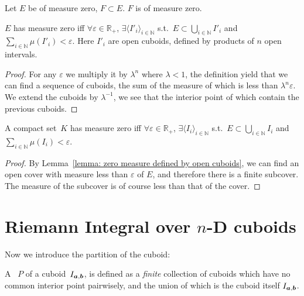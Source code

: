 \documentclass[openany]{book}
\begin{document}
\begin{theorem}
	\label{theorem: the subset of a set of measure zero is also of measure zero}
	Let $E$ be of measure zero, $F \subset E$. $F$ is of measure zero.
\end{theorem}

\begin{lemma}
	\label{lemma: zero measure defined by open cuboids}
	$E$ has measure zero iff $\forall \varepsilon \in \mathbb R_+$, $\exists \langle I'_i\rangle_{i \in \mathbb N}$ s.t.\ $E \subset \bigcup_{i \in \mathbb N} I'_i$ and $\sum_{i \in \mathbb N} \mu(I'_i) < \varepsilon$.
	Here $I'_i$ are open cuboids, defined by products of $n$ open intervals. 
\end{lemma}
\begin{proof}
	For any $\varepsilon$ we multiply it by $\lambda^n$ where $\lambda < 1$, the definition yield that we can find a sequence of cuboids, the sum of the measure of which is less than $\lambda^n \varepsilon$.
	We extend the cuboids by $\lambda^{-1}$, we see that the interior point of which contain the previous cuboids.
\end{proof}

\begin{theorem}
	\label{theorem: compact zero measure defined by finite cuboids}
	A compact set~$K$ has measure zero iff $\forall \varepsilon \in \mathbb R_+$, $\exists \langle I_i\rangle_{i \in \mathbb N}$ s.t.\ $E \subset \bigcup_{i \in \mathbb N} I_i$ and $\sum_{i \in \mathbb N} \mu(I_i) < \varepsilon$. 
\end{theorem}
\begin{proof}
	By Lemma~\ref{lemma: zero measure defined by open cuboids}, we can find an open cover with measure less than $\varepsilon$ of $E$, and therefore there is a finite subcover. 
	The measure of the subcover is of course less than that of the cover. 
\end{proof}

\section{\texorpdfstring{Riemann Integral over $n$-D cuboids}{Riemann Integral over n-D cuboids}}

Now we introduce the partition of the cuboid: 
\begin{definition}
	A ~$P$ of a cuboid~$I_{\boldsymbol{a}, \boldsymbol{b}}$, is defined as a \emph{finite} collection of cuboids which have no common interior point pairwisely, and the union of which is the cuboid itself $I_{\boldsymbol{a}, \boldsymbol{b}}$.
\end{definition}
\end{document}
